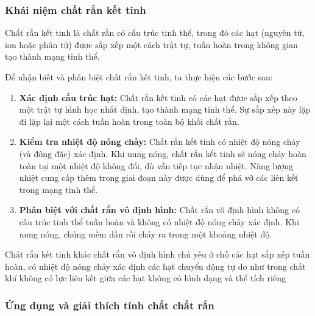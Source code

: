 \subsubsection{Khái niệm chất rắn kết tinh}

Chất rắn kết tinh là chất rắn có cấu trúc tinh thể, trong đó các hạt (nguyên tử, ion hoặc phân tử) được sắp xếp một cách trật tự, tuần hoàn trong không gian tạo thành mạng tinh thể.

\begin{phuongphap}
Để nhận biết và phân biệt chất rắn kết tinh, ta thực hiện các bước sau:
\begin{enumerate}
    \item \textbf{Xác định cấu trúc hạt:} Chất rắn kết tinh có các hạt được sắp xếp theo một trật tự hình học nhất định, tạo thành mạng tinh thể. Sự sắp xếp này lặp đi lặp lại một cách tuần hoàn trong toàn bộ khối chất rắn.
    \item \textbf{Kiểm tra nhiệt độ nóng chảy:} Chất rắn kết tinh có nhiệt độ nóng chảy (và đông đặc) xác định. Khi nung nóng, chất rắn kết tinh sẽ nóng chảy hoàn toàn tại một nhiệt độ không đổi, dù vẫn tiếp tục nhận nhiệt. Năng lượng nhiệt cung cấp thêm trong giai đoạn này được dùng để phá vỡ các liên kết trong mạng tinh thể.
    \item \textbf{Phân biệt với chất rắn vô định hình:} Chất rắn vô định hình không có cấu trúc tinh thể tuần hoàn và không có nhiệt độ nóng chảy xác định. Khi nung nóng, chúng mềm dần rồi chảy ra trong một khoảng nhiệt độ.
\end{enumerate}
\end{phuongphap}

\begin{vidumau}
Chất rắn kết tinh khác chất rắn vô định hình chủ yếu ở chỗ
\choice
{\True các hạt sắp xếp tuần hoàn, có nhiệt độ nóng chảy xác định}
{các hạt chuyển động tự do như trong chất khí}
{không có lực liên kết giữa các hạt}
{không có hình dạng và thể tích riêng}
\end{vidumau}
\subsubsection{Ứng dụng và giải thích tính chất chất rắn}

